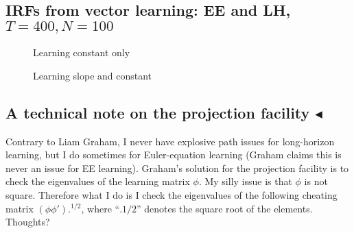 \documentclass[11pt]{article}
\def \myFigPath {../figures/}
\renewcommand{\[}{\begin{equation}}
\renewcommand{\]}{\end{equation}}
\def\mySmallerFigScale{0.18}
\begin{document}
\newpage
\subsection{IRFs from vector learning: EE and LH, $T=400, N=100$}
\begin{figure}[h!]
\caption{Learning constant only}
\end{figure}

\begin{figure}[h!]
\caption{Learning slope and constant}
\end{figure}


\subsection{A technical note on the projection facility $\blacktriangleleft$}
Contrary to Liam Graham, I never have explosive path issues for long-horizon learning, but I do sometimes for Euler-equation learning (Graham claims this is never an issue for EE learning). Graham's solution for the projection facility is to check the eigenvalues of the learning matrix $\phi$. My silly issue is that $\phi$ is not square. Therefore what I do is I check the eigenvalues of the following cheating matrix $(\phi\phi').^{1/2}$, where ``$.{1/2}$'' denotes the square root of the elements. Thoughts?
\end{document}
